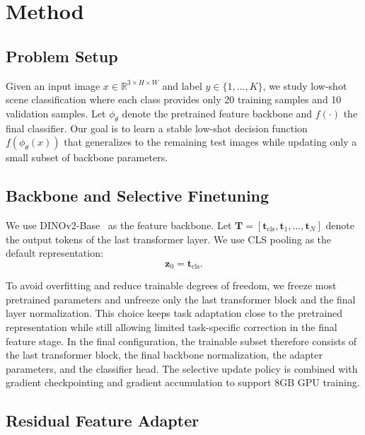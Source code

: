 \section{Method}
\label{sec:method}

\subsection{Problem Setup}

Given an input image $x \in \mathbb{R}^{3 \times H \times W}$ and label $y \in \{1, \dots, K\}$, we study low-shot scene classification where each class provides only 20 training samples and 10 validation samples. Let $\phi_{\theta}$ denote the pretrained feature backbone and $f(\cdot)$ the final classifier. Our goal is to learn a stable low-shot decision function $f(\phi_{\theta}(x))$ that generalizes to the remaining test images while updating only a small subset of backbone parameters.

\subsection{Backbone and Selective Finetuning}

We use DINOv2-Base~\cite{oquab2023dinov2} as the feature backbone. Let $\mathbf{T} = [\mathbf{t}_{\text{cls}}, \mathbf{t}_1, \dots, \mathbf{t}_N]$ denote the output tokens of the last transformer layer. We use CLS pooling as the default representation:
\begin{equation}
\mathbf{z}_0 = \mathbf{t}_{\text{cls}}.
\end{equation}

To avoid overfitting and reduce trainable degrees of freedom, we freeze most pretrained parameters and unfreeze only the last transformer block and the final layer normalization. This choice keeps task adaptation close to the pretrained representation while still allowing limited task-specific correction in the final feature stage. In the final configuration, the trainable subset therefore consists of the last transformer block, the final backbone normalization, the adapter parameters, and the classifier head. The selective update policy is combined with gradient checkpointing and gradient accumulation to support 8GB GPU training.

\subsection{Residual Feature Adapter}


